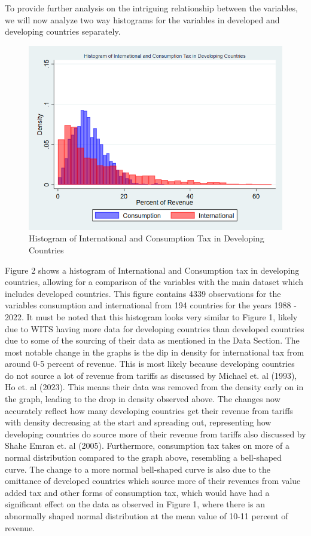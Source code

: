 \documentclass[12pt]{article}
\begin{document}
To provide further analysis on the intriguing relationship between the variables, we will now analyze two way histograms for the variables in developed and developing countries separately.
\begin{figure}[H]
    \centering
    \includegraphics[width=0.8\linewidth]{Reproducibility_Package//research_outputs/twowaydevelopinghistintcons.png}
    \caption{Histogram of International and Consumption Tax in Developing Countries}
    \label{fig:enter-label}
\end{figure}

Figure 2 shows a histogram of International and Consumption tax in developing countries, allowing for a comparison of the variables with the main dataset which includes developed countries. This figure contains 4339 observations for the variables consumption and international from 194 countries for the years 1988 - 2022.  It must be noted that this histogram looks very similar to Figure 1, likely due to WITS having more data for developing countries than developed countries due to some of the sourcing of their data as mentioned in the Data Section. The most notable change in the graphs is the dip in density for international tax from around 0-5 percent of revenue. This is most likely because developing countries do not source a lot of revenue from tariffs as discussed by Michael et. al (1993), Ho et. al (2023). This means their data was removed from the density early on in the graph, leading to the drop in density observed above. The changes now accurately reflect how many developing countries get their revenue from tariffs with density decreasing at the start and spreading out, representing how developing countries do source more of their revenue from tariffs also discussed by Shahe Emran et. al (2005). Furthermore, consumption tax takes on more of a normal distribution compared to the graph above, resembling a bell-shaped curve. The change to a more normal bell-shaped curve is also due to the omittance of developed countries which source more of their revenues from value added tax and other forms of consumption tax, which would have had a significant effect on the data as observed in Figure 1, where there is an abnormally shaped normal distribution at the mean value of 10-11 percent of revenue. 
\end{document}
